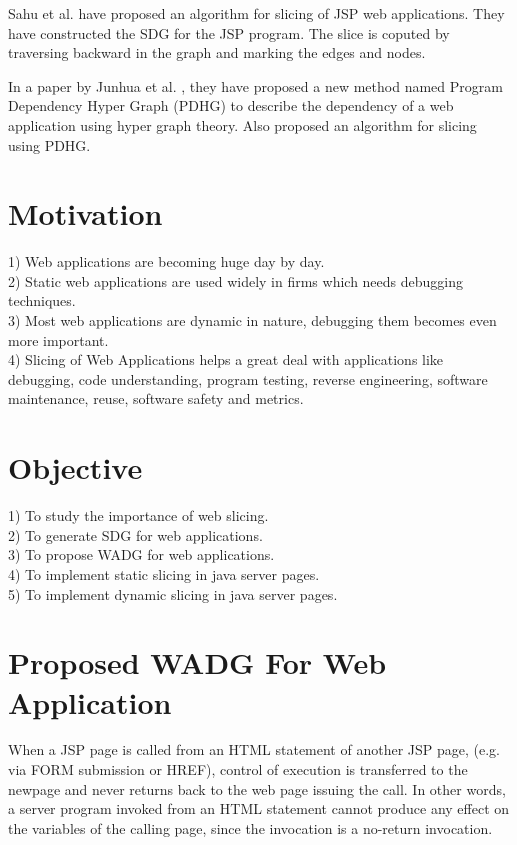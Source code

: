 \documentclass[11pt]{article}   %
\begin{document}
\par Sahu et al. \cite{sahu2008slicing} have proposed an algorithm for slicing of JSP web applications. They have constructed the SDG for the JSP program. The slice is coputed by traversing backward in the graph and marking the edges and nodes.

\par In a paper by Junhua et al. \cite{casalanguida2009aspect}, they have proposed a new method named Program Dependency Hyper Graph (PDHG) to describe the dependency of a web application using hyper graph theory. Also proposed an algorithm for slicing using PDHG.

\section{Motivation}
1) Web applications are becoming huge day by day.\\
2) Static web applications are used widely in firms which needs debugging techniques.\\
3) Most web applications are dynamic in nature, debugging them becomes even more important.\\
4) Slicing of Web Applications helps a great deal with applications like debugging, code understanding, program testing, reverse engineering, software maintenance, reuse, software safety and metrics.
\section{Objective}
1) To study the importance of web slicing.\\
2) To generate SDG for web applications.\\
3) To propose WADG for web applications.\\
4) To implement static slicing in java server pages.\\
5) To implement dynamic slicing in java server pages.\\
\section{Proposed WADG For Web Application}

When a JSP page is called from an HTML statement of another JSP page, (e.g. via FORM submission or HREF), control of execution is transferred to the newpage and never returns back to the web page issuing the call. In other words, a server program invoked from an HTML statement cannot produce any effect on the variables of the calling page, since the invocation is a no-return invocation.
\end{document}
